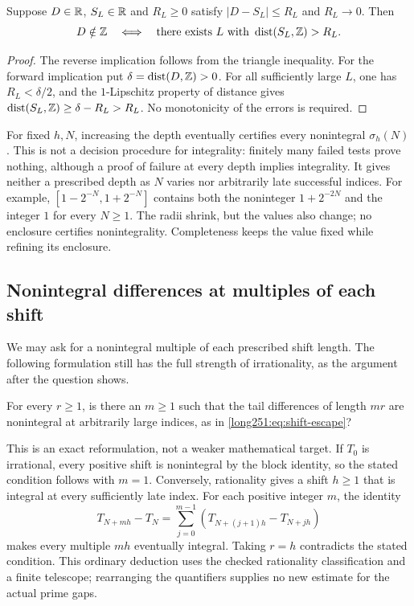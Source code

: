 \documentclass[11pt]{article}
\makeatletter
\newcommand{\compatlabel}[1]{\ltx@label{#1}}
\makeatother
\begin{document}
\begin{proposition}\label{long251:res:complete-truncation}
Suppose $D\in\mathbb{R}$, $S_L\in\mathbb{R}$ and $R_L\ge0$ satisfy
$|D-S_L|\le R_L$ and $R_L\to0$.  Then
\[
 D\notin\mathbb{Z}\quad\Longleftrightarrow\quad
 \text{there exists }L\text{ with }\operatorname{dist}(S_L,\mathbb{Z})>R_L.
\]
\end{proposition}
\begin{proof}
The reverse implication follows from the triangle inequality.
For the forward implication put $\delta=\operatorname{dist}(D,\mathbb{Z})>0$.
For all sufficiently large $L$, one has $R_L<\delta/2$, and the
$1$-Lipschitz property of distance gives
$\operatorname{dist}(S_L,\mathbb{Z})\ge\delta-R_L>R_L$.
No monotonicity of the errors is required.
\end{proof}
For fixed $h,N$, increasing the depth eventually certifies every
nonintegral $\sigma_h(N)$.  This is not a decision procedure for
integrality: finitely many failed tests prove nothing, although a
proof of failure at every depth implies integrality.  It gives neither
a prescribed depth as $N$ varies nor arbitrarily late successful indices.
For example, $[1-2^{-N},1+2^{-N}]$ contains both the noninteger
$1+2^{-2N}$ and the integer $1$ for every $N\ge1$.  The radii shrink,
but the values also change; no enclosure certifies nonintegrality.
Completeness keeps the value fixed while refining its enclosure.

\subsection{Nonintegral differences at multiples of each shift}\label{long251:sec:xr-divisorhit}

We may ask for a nonintegral multiple of each prescribed shift length.
The following formulation still has the full strength of irrationality,
as the argument after the question shows.

\begin{problem}\label{long251:xr:divisor-hit}\compatlabel{prob:divisor-hit}
For every $r\ge1$, is there an $m\ge1$ such that the tail differences
of length $mr$ are nonintegral at arbitrarily large indices, as in
\eqref{long251:eq:shift-escape}?
\end{problem}

This is an exact reformulation, not a weaker mathematical target.
If $T_0$ is irrational, every positive shift is nonintegral by the block
identity, so the stated condition follows with $m=1$.  Conversely,
rationality gives a shift $h\ge1$ that is integral at every sufficiently
late index.  For each positive integer $m$, the identity
\[
 T_{N+mh}-T_N=\sum_{j=0}^{m-1}(T_{N+(j+1)h}-T_{N+jh})
\]
makes every multiple $mh$ eventually integral.  Taking $r=h$ contradicts
the stated condition.  This ordinary deduction uses the checked
rationality classification and a finite telescope; rearranging the
quantifiers supplies no new estimate for the actual prime gaps.
\end{document}
